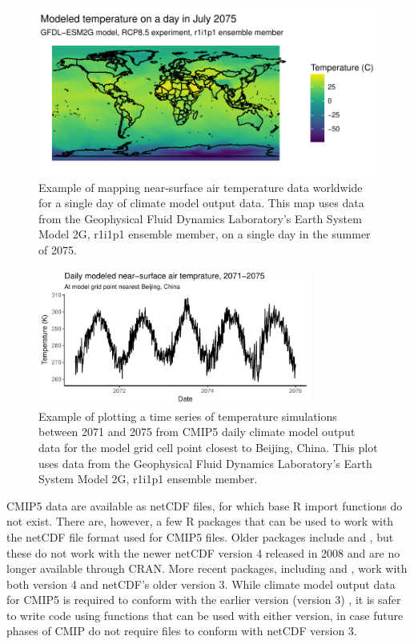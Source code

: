 \begin{figure}
\begin{center}
\includegraphics[width = \textwidth]{worldmapexample}
\end{center}
\caption{Example of mapping near-surface air temperature data worldwide for a single day of climate model output data. This map uses data from the Geophysical Fluid Dynamics Laboratory's Earth System Model 2G, r1i1p1 ensemble member, on a single day in the summer of 2075.}
\label{fig:worldmap}
\end{figure}

\begin{figure}
\begin{center}
\includegraphics[width = 0.8\textwidth]{timeseriesexample}
\end{center}
\caption{Example of plotting a time series of temperature simulations between 2071 and 2075 from CMIP5 daily climate model output data for the model grid cell point closest to Beijing, China. This plot uses data from the Geophysical Fluid Dynamics Laboratory's Earth System Model 2G, r1i1p1 ensemble member.}
\label{fig:timeseries}
\end{figure}

CMIP5 data are available as netCDF files, for which base R import
functions do not exist. There are, however, a few R packages that can be
used to work with the netCDF file format used for CMIP5 files. Older
packages include  and , but these do not work with
the newer netCDF version 4 released in 2008 and are no longer available
through CRAN. More recent packages, including  \citep{ncdf4}
and  \citep{michna2013rnetcdf, RNetCDF}, work with both
version 4 and netCDF's older version 3. While climate model output data
for CMIP5 is required to conform with the earlier version (version 3)
\citep{taylor2010cmip5}, it is safer to write code using functions that
can be used with either version, in case future phases of CMIP do not
require files to conform with netCDF version 3.

